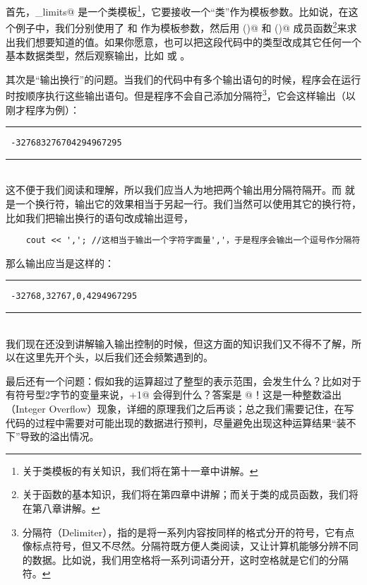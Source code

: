 首先，\lstinline@numeric_limits@ 是一个类模板\footnote{关于类模板的有关知识，我们将在第十一章中讲解。}，它要接收一个``类''作为模板参数。比如说，在这个例子中，我们分别使用了 \lstinline@short@ 和 \lstinline@unsigned@ 作为模板参数，然后用 \lstinline@lowest()@ 和 \lstinline@max()@ 成员函数\footnote{关于函数的基本知识，我们将在第四章中讲解；而关于类的成员函数，我们将在第八章讲解。}来求出我们想要知道的值。如果你愿意，也可以把这段代码中的类型改成其它任何一个基本数据类型，然后观察输出，比如 \lstinline@double@ 或 \lstinline@char@。\par
其次是``输出换行''的问题。当我们的代码中有多个输出语句的时候，程序会在运行时按顺序执行这些输出语句。但是程序不会自己添加分隔符\footnote{分隔符（Delimiter），指的是将一系列内容按同样的格式分开的符号，它有点像标点符号，但又不尽然。分隔符既方便人类阅读，又让计算机能够分辨不同的数据。比如说，我们用空格将一系列词语分开，这时空格就是它们的分隔符。}，它会这样输出（以刚才程序为例）：\\\noindent\rule{\textwidth}{.2pt}\texttt{
-327683276704294967295
}\\\noindent\rule{\textwidth}{.2pt}\\
这不便于我们阅读和理解，所以我们应当人为地把两个输出用分隔符隔开。而 \lstinline@cout@ 就是一个换行符，输出它的效果相当于另起一行。我们当然可以使用其它的换行符，比如我们把输出换行的语句改成输出逗号，
\begin{lstlisting}
    cout << ','; //这相当于输出一个字符字面量','，于是程序会输出一个逗号作分隔符
\end{lstlisting}
那么输出应当是这样的：\\\noindent\rule{\textwidth}{.2pt}\texttt{
-32768,32767,0,4294967295
}\\\noindent\rule{\textwidth}{.2pt}\\
我们现在还没到讲解输入输出控制的时候，但这方面的知识我们又不得不了解，所以在这里先开个头，以后我们还会频繁遇到的。\par
最后还有一个问题：假如我的运算超过了整型的表示范围，会发生什么？比如对于有符号型2字节的变量来说，+1@ 会得到什么？答案是 @！这是一种整数溢出（Integer Overflow）现象，详细的原理我们之后再谈；总之我们需要记住，在写代码的过程中需要对可能出现的数据进行预判，尽量避免出现这种运算结果``装不下''导致的溢出情况。\par
